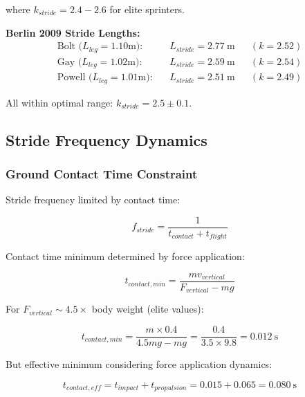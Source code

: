where $k_{stride} = 2.4-2.6$ for elite sprinters.

\textbf{Berlin 2009 Stride Lengths:}
\begin{align}
\text{Bolt (}L_{leg}=1.10\text{m)}: && L_{stride} = 2.77~\text{m} && (k = 2.52) \\
\text{Gay (}L_{leg}=1.02\text{m)}: && L_{stride} = 2.59~\text{m} && (k = 2.54) \\
\text{Powell (}L_{leg}=1.01\text{m)}: && L_{stride} = 2.51~\text{m} && (k = 2.49)
\end{align}

All within optimal range: $k_{stride} = 2.5 \pm 0.1$.

\subsection{Stride Frequency Dynamics}

\subsubsection{Ground Contact Time Constraint}

Stride frequency limited by contact time:

\begin{equation}
f_{stride} = \frac{1}{t_{contact} + t_{flight}}
\label{eq:stride_frequency_definition}
\end{equation}

Contact time minimum determined by force application:

\begin{equation}
t_{contact,min} = \frac{m v_{vertical}}{F_{vertical} - mg}
\label{eq:minimum_contact_time}
\end{equation}

For $F_{vertical} \sim 4.5 \times$ body weight (elite values):

\begin{equation}
t_{contact,min} = \frac{m \times 0.4}{4.5 mg - mg} = \frac{0.4}{3.5 \times 9.8} = 0.012~\text{s}
\label{eq:contact_time_calc}
\end{equation}

But effective minimum considering force application dynamics:

\begin{equation}
t_{contact,eff} = t_{impact} + t_{propulsion} = 0.015 + 0.065 = 0.080~\text{s}
\label{eq:effective_contact_time}
\end{equation}

